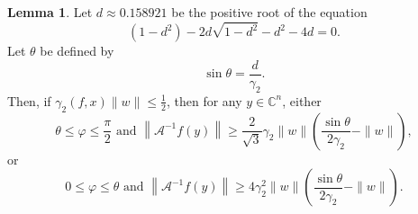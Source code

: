 \documentclass[12pt,oneside,reqno]{amsart}
\theoremstyle{definition}
\newtheorem{lem}[thm]{Lemma}
\begin{document}
		\begin{lem}\label{lem:operatorlowerbound}
			Let $d\approx 0.158921$ be the positive root of the equation 
			\begin{equation*}
			(1-d^2)-2d\sqrt{1-d^2}-d^2 -4d=0.
			\end{equation*}
			Let $\theta$ be defined by 
			\begin{equation*}
			\sin \theta=\frac{d}{\gamma_2}.
			\end{equation*}
			Then, if $\gamma_2(f,x)\|w\|\leq \frac{1}{2}$, then for any $y\in \mathbb{C}^n$, either
			\[\theta\leq \varphi\leq \frac{\pi}{2}\text{ and }\left\|\mathcal{A}^{-1}f(y)\right\|\geq \frac{2}{\sqrt{3}}\gamma_2\|w\|\left(\frac{\sin\theta}{2\gamma_2}-\|w\|\right),\]
			or
			\[0\leq \varphi \leq \theta \text{ and }\left\|\mathcal{A}^{-1}f(y)\right\|\geq 4\gamma_2^2\|w\|\left(\frac{\sin\theta}{2\gamma_2}-\|w\|\right).\]
		\end{lem}
\end{document}
